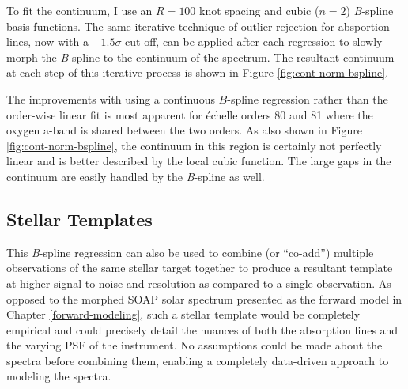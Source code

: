 To fit the continuum, I use an $R=100$ knot spacing and cubic ($n=2$) \textit{B}-spline basis functions. The same iterative technique of outlier rejection for absportion lines, now with a $-1.5\sigma$ cut-off, can be applied after each regression to slowly morph the \textit{B}-spline to the continuum of the spectrum. The resultant continuum at each step of this iterative process is shown in Figure \ref{fig:cont-norm-bspline}.

The improvements with using a continuous $B$-spline regression rather than the order-wise linear fit is most apparent for \'{e}chelle orders 80 and 81 where the oxygen a-band is shared between the two orders. As also shown in Figure \ref{fig:cont-norm-bspline}, the continuum in this region is certainly not perfectly linear and is better described by the local cubic function. The large gaps in the continuum are easily handled by the \textit{B}-spline as well.

\subsection{Stellar Templates} \label{pipeline2:bspline:templates}

This \textit{B}-spline regression can also be used to combine (or ``co-add'') multiple observations of the same stellar target together to produce a resultant template at higher signal-to-noise and resolution as compared to a single observation. As opposed to the morphed SOAP solar spectrum presented as the forward model in Chapter \ref{forward-modeling}, such a stellar template would be completely empirical and could precisely detail the nuances of both the absorption lines and the varying PSF of the instrument. No assumptions could be made about the spectra before combining them, enabling a completely data-driven approach to modeling the spectra.

